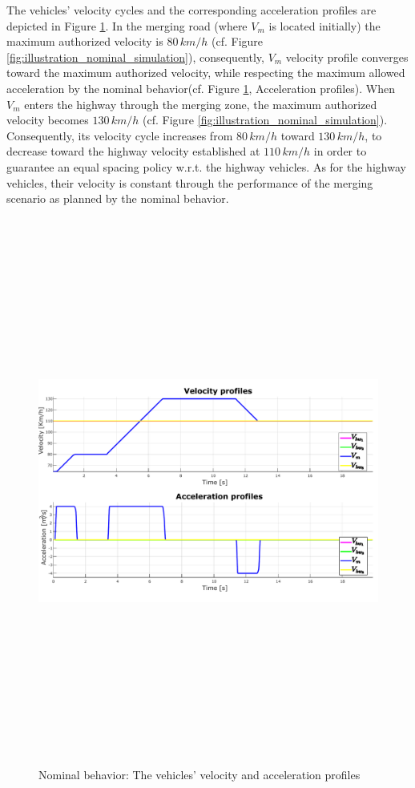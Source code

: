 The vehicles' velocity cycles and the corresponding acceleration profiles are depicted in Figure \ref{fig:nominal_dynamics}. In the merging road (where $V_m$ is located initially) the maximum authorized velocity is $80\,km/h$ (cf. Figure \ref{fig:illustration_nominal_simulation}), consequently, $V_m$ velocity profile converges toward the maximum authorized velocity, while respecting the maximum allowed acceleration by the nominal behavior(cf. Figure \ref{fig:nominal_dynamics}, Acceleration profiles). When $V_m$ enters the highway through the merging zone, the maximum authorized velocity becomes $130\,km/h$ (cf. Figure \ref{fig:illustration_nominal_simulation}). Consequently, its velocity cycle increases from $80\,km/h$ toward $130\,km/h$, to decrease toward the highway velocity established at $110 \,km/h$ in order to guarantee an equal spacing policy w.r.t. the highway vehicles. As for the highway vehicles, their velocity is constant through the performance of the merging scenario as planned by the nominal behavior. 
     \begin{figure}[!h]
        \centering 
        \includegraphics[width=12cm,height=18cm,keepaspectratio]{chapters/Chapitre_6/Nominal_Dynamics.pdf}
        \caption{Nominal behavior: The vehicles' velocity and acceleration profiles}
        \label{fig:nominal_dynamics}
        \end{figure}



